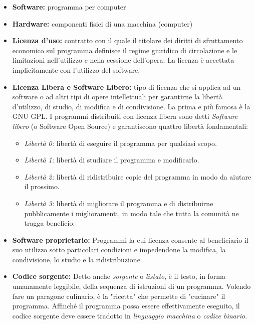\documentclass[a4paper, 12pt]{extarticle}
\begin{document}
\begin{itemize}
  \item \textbf{Software:}
    programma per computer
  \item \textbf{Hardware:}
    componenti fisici di una macchina (computer)
  \item \textbf{Licenza d'uso:}
    contratto con il quale il titolare dei diritti di sfruttamento
    economico sul programma definisce il regime giuridico di
    circolazione e le limitazioni nell'utilizzo e nella cessione
    dell'opera. La licenza è accettata implicitamente con l'utilizzo
    del software.
  \item \textbf{Licenza Libera e Software Libero:}
    tipo di licenza che si applica ad un software o ad altri tipi di
    opere intellettuali per garantirne la libertà d'utilizzo, di
    studio, di modifica e di condivisione. La prima e più famosa è la
    GNU GPL. I programmi distribuiti con licenza libera sono detti
    \textit{Software libero} (o Software Open Source) e garantiscono
    quattro libertà fondamentali:

    \begin{itemize}
      \item \textit{Libertà 0:} libertà di eseguire il programma per
        qualsiasi scopo.
      \item \textit{Libertà 1:} libertà di studiare il programma e
        modificarlo.
      \item \textit{Libertà 2:} libertà di ridistribuire copie del
        programma in modo da aiutare il prossimo.
      \item \textit{Libertà 3:} libertà di migliorare il programma e di
        distribuirne pubblicamente i miglioramenti, in modo tale che
        tutta la comunità ne tragga beneficio.
    \end{itemize}

  \item \textbf{Software proprietario:}
    Programmi la cui licenza consente al beneficiario il suo utilizzo
    sotto particolari condizioni e impedendone la modifica, la
    condivisione, lo studio e la ridistribuzione.

  \item \textbf{Codice sorgente:}
    Detto anche \textit{sorgente} o \textit{listato}, è il testo, in
    forma umanamente leggibile, della sequenza di istruzioni di un
    programma. Volendo fare un paragone culinario, è la "ricetta" che
    permette di "cucinare" il programma. Affinché il programma possa
    essere effettivamente eseguito, il codice sorgente deve essere
    tradotto in \textit{linguaggio macchina} o \textit{codice binario}.

\end{itemize}
\end{document}
